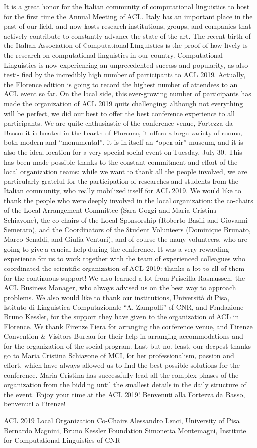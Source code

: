 It is a great honor for the Italian community of computational linguistics to host for the first time the Annual Meeting of ACL. Italy has an important place in the past of our field, and now hosts research institutions, groups, and companies that actively contribute to constantly advance the state of the art. The recent birth of the Italian Association of Computational Linguistics is the proof of how lively is the research on computational linguistics in our country.
Computational Linguistics is now experiencing an unprecedented success and popularity, as also testi- fied by the incredibly high number of participants to ACL 2019. Actually, the Florence edition is going to record the highest number of attendees to an ACL event so far. On the local side, this ever-growing number of participants has made the organization of ACL 2019 quite challenging: although not everything will be perfect, we did our best to offer the best conference experience to all participants.
We are quite enthusiastic of the conference venue, Fortezza da Basso: it is located in the hearth of Florence, it offers a large variety of rooms, both modern and “monumental”, it is in itself an “open air” museum, and it is also the ideal location for a very special social event on Tuesday, July 30.
This has been made possible thanks to the constant commitment and effort of the local organization teams: while we want to thank all the people involved, we are particularly grateful for the participation of researches and students from the Italian community, who really mobilized itself for ACL 2019. We would like to thank the people who were deeply involved in the local organization: the co-chairs of the Local Arrangement Committee (Sara Goggi and Maria Cristina Schiavone), the co-chairs of the Local Sponsorship (Roberto Basili and Giovanni Semeraro), and the Coordinators of the Student Volunteers (Dominique Brunato, Marco Senaldi, and Giulia Venturi), and of course the many volunteers, who are going to give a crucial help during the conference.
It was a very rewarding experience for us to work together with the team of experienced colleagues who coordinated the scientific organization of ACL 2019: thanks a lot to all of them for the continuous support! We also learned a lot from Priscilla Rasmussen, the ACL Business Manager, who always advised us on the best way to approach problems.
We also would like to thank our institutions, Università di Pisa, Istituto di Linguistica Computazionale “A. Zampolli” of CNR, and Fondazione Bruno Kessler, for the support they have given to the organization of ACL in Florence.
We thank Firenze Fiera for arranging the conference venue, and Firenze Convention \& Visitors Bureau for their help in arranging accommodations and for the organization of the social program.
Last but not least, our deepest thanks go to Maria Cristina Schiavone of MCI, for her professionalism, passion and effort, which have always allowed us to find the best possible solutions for the conference. Maria Cristina has successfully lead all the complex phases of the organization from the bidding until the smallest details in the daily structure of the event.
Enjoy your time at the ACL 2019! Benvenuti alla Fortezza da Basso, benvenuti a Firenze!

ACL 2019 Local Organization Co-Chairs
Alessandro Lenci, University of Pisa
Bernardo Magnini, Bruno Kessler Foundation
Simonetta Montemagni, Institute for Computational Linguistics of CNR